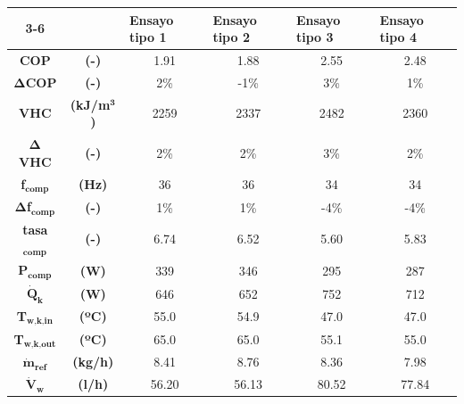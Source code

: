 
\begin{tabular}{cc|c|c|c|c|}
\cline{3-6}
\multicolumn{1}{l}{} & \multicolumn{1}{l|}{} & \multicolumn{1}{l|}{\textbf{Ensayo tipo 1}} & \multicolumn{1}{l|}{\textbf{Ensayo tipo 2}} & \multicolumn{1}{l|}{\textbf{Ensayo tipo 3}} & \multicolumn{1}{l|}{\textbf{Ensayo tipo 4}} \\ \hline
\multicolumn{1}{|c}{\textbf{COP}} & \textbf{(-)} & 1.91 & 1.88 & 2.55 & 2.48 \\ \hline
\multicolumn{1}{|c}{$\bm{\Delta}$\textbf{COP}} & \textbf{(-)} & 2\% & -1\% & 3\% & 1\% \\ \hline
\multicolumn{1}{|c}{\textbf{VHC}} & \textbf{(kJ/m$^\textbf{3}$)} & 2259 & 2337 & 2482 & 2360 \\ \hline
\multicolumn{1}{|c}{$\bm{\Delta}$\textbf{VHC}} & \textbf{(-)} & 2\% & 2\% & 3\% & 2\% \\ \hline
\multicolumn{1}{|c}{\textbf{f}$_\textbf{comp}$} & \textbf{(Hz)} & 36 & 36 & 34 & 34 \\ \hline
\multicolumn{1}{|c}{$\bm{\Delta}$\textbf{f}$_\textbf{comp}$} & \textbf{(-)} & 1\% & 1\% & -4\% & -4\% \\ \hline
\multicolumn{1}{|c}{\textbf{tasa}$_\textbf{comp}$} & \textbf{(-)} & 6.74 & 6.52 & 5.60 & 5.83 \\ \hline
\multicolumn{1}{|c}{\textbf{P}$_\textbf{comp}$} & \textbf{(W)} & 339 & 346 & 295 & 287 \\ \hline
\multicolumn{1}{|c}{$\dot{\textbf{Q}}_\textbf{k}$} & \textbf{(W)} & 646 & 652 & 752 & 712 \\ \hline
\multicolumn{1}{|c}{\textbf{T}$_\textbf{w,k,in}$} & \textbf{(ºC)} & 55.0 & 54.9 & 47.0 & 47.0 \\ \hline
\multicolumn{1}{|c}{\textbf{T}$_\textbf{w,k,out}$} & \textbf{(ºC)} & 65.0 & 65.0 & 55.1 & 55.0 \\ \hline
\multicolumn{1}{|c}{$\dot{\textbf{m}}_\textbf{ref}$} & \textbf{(kg/h)} & 8.41 & 8.76 & 8.36 & 7.98 \\ \hline
\multicolumn{1}{|c}{$\dot{\textbf{V}}_\textbf{w}$} & \textbf{(l/h)} & 56.20 & 56.13 & 80.52 & 77.84 \\ \hline
\end{tabular}
